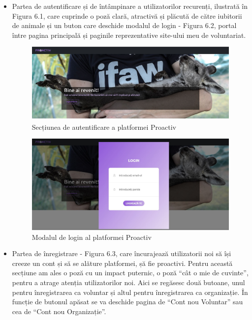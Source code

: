 \documentclass[12pt,a4paper]{report}
\begin{document}
\begin{itemize}
  \item Partea de autentificare și de întâmpinare a utilizatorilor recurenți, ilustrată în Figura 6.1, care cuprinde o poză clară, atractivă și plăcută de către iubitorii de animale și un buton care deschide modalul de login - Figura 6.2, portal între pagina principală și paginile reprezentative site-ului meu de voluntariat.
\\
\begin{figure}[H]
\centering
  \includegraphics[width=1\linewidth]{./imagini/pp1.jpg}
  \caption{Secțiunea de autentificare a platformei Proactiv}
\end{figure}
\begin{figure}[H]
\centering
  \includegraphics[width=1\linewidth]{./imagini/login.jpg}
  \caption{Modalul de login al platformei Proactiv}
\end{figure}
  \item Partea de înregistrare - Figura 6.3, care încurajează utilizatorii noi să își creeze un cont și să se alăture platformei, șă fie proactivi. Pentru această secțiune am ales o poză cu un impact puternic, o poză “cât o mie de cuvinte”, pentru a atrage atenția utilizatorilor noi. Aici se regăsesc două butoane, unul pentru înregistrarea ca voluntar și altul pentru înregistrarea ca organizație. În funcție de butonul apăsat se va deschide pagina de “Cont nou Voluntar” sau cea de “Cont nou Organizație”.
\\

\end{itemize}
\end{document}
